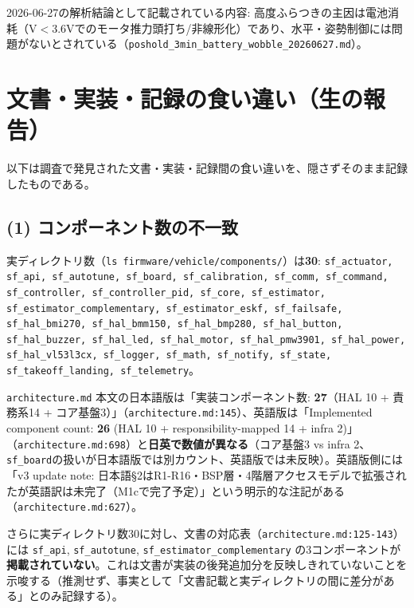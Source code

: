 \documentclass[a4paper,10pt]{ltjsarticle}
\begin{document}
2026-06-27の解析結論として記載されている内容: 高度ふらつきの主因は電池消耗（V$<$3.6Vでのモータ推力頭打ち/非線形化）であり、水平・姿勢制御には問題がないとされている（\texttt{poshold\_3min\_battery\_wobble\_20260627.md}）。

\section{文書・実装・記録の食い違い（生の報告）}

以下は調査で発見された文書・実装・記録間の食い違いを、隠さずそのまま記録したものである。

\subsection*{(1) コンポーネント数の不一致}

実ディレクトリ数（\texttt{ls firmware/vehicle/components/}）は\textbf{30}: \texttt{sf\_actuator, sf\_api, sf\_autotune, sf\_board, sf\_calibration, sf\_comm, sf\_command, sf\_controller, sf\_controller\_pid, sf\_core, sf\_estimator, sf\_estimator\_complementary, sf\_estimator\_eskf, sf\_failsafe, sf\_hal\_bmi270, sf\_hal\_bmm150, sf\_hal\_bmp280, sf\_hal\_button, sf\_hal\_buzzer, sf\_hal\_led, sf\_hal\_motor, sf\_hal\_pmw3901, sf\_hal\_power, sf\_hal\_vl53l3cx, sf\_logger, sf\_math, sf\_notify, sf\_state, sf\_takeoff\_landing, sf\_telemetry}。

\texttt{architecture.md} 本文の日本語版は「実装コンポーネント数: \textbf{27}（HAL 10 + 責務系14 + コア基盤3）」（\texttt{architecture.md:145}）、英語版は「Implemented component count: \textbf{26} (HAL 10 + responsibility-mapped 14 + infra 2)」（\texttt{architecture.md:698}）と\textbf{日英で数値が異なる}（コア基盤3 vs infra 2、\texttt{sf\_board}の扱いが日本語版では別カウント、英語版では未反映）。英語版側には「v3 update note: 日本語§2はR1-R16・BSP層・4階層アクセスモデルで拡張されたが英語訳は未完了（M1cで完了予定）」という明示的な注記がある（\texttt{architecture.md:627}）。

さらに実ディレクトリ数30に対し、文書の対応表（\texttt{architecture.md:125-143}）には \texttt{sf\_api}, \texttt{sf\_autotune}, \texttt{sf\_estimator\_complementary} の3コンポーネントが\textbf{掲載されていない}。これは文書が実装の後発追加分を反映しきれていないことを示唆する（推測せず、事実として「文書記載と実ディレクトリの間に差分がある」とのみ記録する）。
\end{document}
